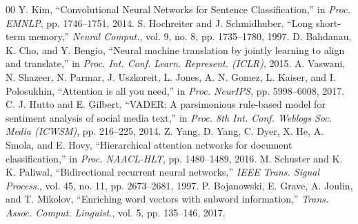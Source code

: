 \documentclass[conference]{IEEEtran}
\begin{document}
\begin{thebibliography}{00}
 Y. Kim, ``Convolutional Neural Networks for Sentence Classification,'' in \textit{Proc. EMNLP}, pp. 1746--1751, 2014.
 S. Hochreiter and J. Schmidhuber, ``Long short-term memory,'' \textit{Neural Comput.}, vol. 9, no. 8, pp. 1735--1780, 1997.
 D. Bahdanau, K. Cho, and Y. Bengio, ``Neural machine translation by jointly learning to align and translate,'' in \textit{Proc. Int. Conf. Learn. Represent. (ICLR)}, 2015.
 A. Vaswani, N. Shazeer, N. Parmar, J. Uszkoreit, L. Jones, A. N. Gomez, L. Kaiser, and I. Polosukhin, ``Attention is all you need,'' in \textit{Proc. NeurIPS}, pp. 5998--6008, 2017.
 C. J. Hutto and E. Gilbert, ``VADER: A parsimonious rule-based model for sentiment analysis of social media text,'' in \textit{Proc. 8th Int. Conf. Weblogs Soc. Media (ICWSM)}, pp. 216--225, 2014.
 Z. Yang, D. Yang, C. Dyer, X. He, A. Smola, and E. Hovy, ``Hierarchical attention networks for document classification,'' in \textit{Proc. NAACL-HLT}, pp. 1480--1489, 2016.
 M. Schuster and K. K. Paliwal, ``Bidirectional recurrent neural networks,'' \textit{IEEE Trans. Signal Process.}, vol. 45, no. 11, pp. 2673--2681, 1997.
 P. Bojanowski, E. Grave, A. Joulin, and T. Mikolov, ``Enriching word vectors with subword information,'' \textit{Trans. Assoc. Comput. Linguist.}, vol. 5, pp. 135--146, 2017.
\end{thebibliography}
\end{document}

